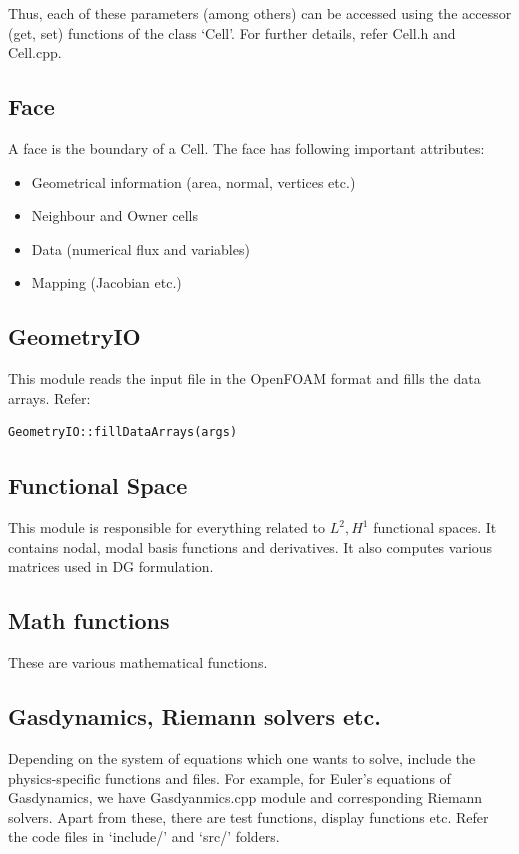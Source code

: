 Thus, each of these parameters (among others) can be accessed using the accessor (get, set) functions of the class `Cell'. 
For further details, refer Cell.h and Cell.cpp.

\subsection{Face}
A face is the boundary of a Cell. The face has following important attributes:
\begin{itemize}
	\item Geometrical information (area, normal, vertices etc.)
	\item Neighbour and Owner cells
	\item Data (numerical flux and variables)
	\item Mapping (Jacobian etc.)
\end{itemize}

\subsection{GeometryIO}
This module reads the input file in the OpenFOAM format and fills the data arrays. Refer:
\begin{verbatim}
GeometryIO::fillDataArrays(args)
\end{verbatim}

\subsection{Functional Space}
This module is responsible for everything related to $L^2, H^1$ functional spaces. It contains nodal, modal basis functions and derivatives.
It also computes various matrices used in DG formulation. 

\subsection{Math functions}
These are various mathematical functions.

\subsection{Gasdynamics, Riemann solvers etc.}
Depending on the system of equations which one wants to solve, include the physics-specific functions and files. For example, for
Euler's equations of Gasdynamics, we have Gasdyanmics.cpp module and corresponding Riemann solvers. 
Apart from these, there are test functions, display functions etc. Refer the code files in `include/' and `src/' folders.

